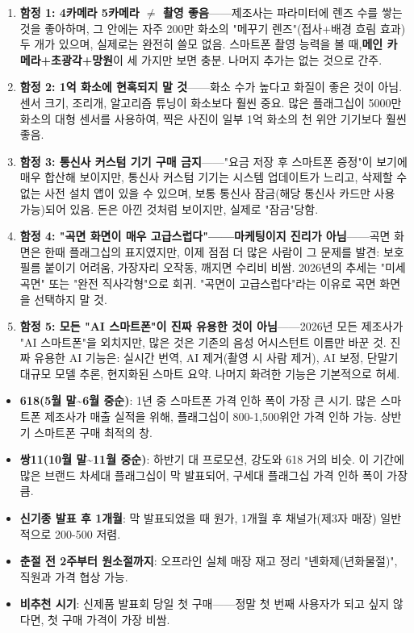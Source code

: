 \begin{enumerate}
  \item \textbf{함정 1: 4카메라 5카메라 $\neq$ 촬영 좋음}——제조사는 파라미터에 렌즈 수를 쌓는 것을 좋아하며, 그 안에는 자주 200만 화소의 "메꾸기 렌즈"(접사+배경 흐림 효과) 두 개가 있으며, 실제로는 완전히 쓸모 없음. 스마트폰 촬영 능력을 볼 때,\textbf{메인 카메라+초광각+망원}이 세 가지만 보면 충분. 나머지 추가는 없는 것으로 간주.
  \item \textbf{함정 2: 1억 화소에 현혹되지 말 것}——화소 수가 높다고 화질이 좋은 것이 아님. 센서 크기, 조리개, 알고리즘 튜닝이 화소보다 훨씬 중요. 많은 플래그십이 5000만 화소의 대형 센서를 사용하여, 찍은 사진이 일부 1억 화소의 천 위안 기기보다 훨씬 좋음.
  \item \textbf{함정 3: 통신사 커스텀 기기 구매 금지}——"요금 저장 후 스마트폰 증정"이 보기에 매우 합산해 보이지만, 통신사 커스텀 기기는 시스템 업데이트가 느리고, 삭제할 수 없는 사전 설치 앱이 있을 수 있으며, 보통 통신사 잠금(해당 통신사 카드만 사용 가능)되어 있음. 돈은 아낀 것처럼 보이지만, 실제로 "잠금"당함.
  \item \textbf{함정 4: "곡면 화면이 매우 고급스럽다"——마케팅이지 진리가 아님}——곡면 화면은 한때 플래그십의 표지였지만, 이제 점점 더 많은 사람이 그 문제를 발견: 보호 필름 붙이기 어려움, 가장자리 오작동, 깨지면 수리비 비쌈. 2026년의 추세는 "미세 곡면" 또는 "완전 직사각형"으로 회귀. "곡면이 고급스럽다"라는 이유로 곡면 화면을 선택하지 말 것.
  \item \textbf{함정 5: 모든 "AI 스마트폰"이 진짜 유용한 것이 아님}——2026년 모든 제조사가 "AI 스마트폰"을 외치지만, 많은 것은 기존의 음성 어시스턴트 이름만 바꾼 것. 진짜 유용한 AI 기능은: 실시간 번역, AI 제거(촬영 시 사람 제거), AI 보정, 단말기 대규모 모델 추론, 현지화된 스마트 요약. 나머지 화려한 기능은 기본적으로 허세.
\end{enumerate}


\begin{itemize}
  \item \textbf{618(5월 말\textasciitilde{}6월 중순)}: 1년 중 스마트폰 가격 인하 폭이 가장 큰 시기. 많은 스마트폰 제조사가 매출 실적을 위해, 플래그십이 800-1,500위안 가격 인하 가능. 상반기 스마트폰 구매 최적의 창.
  \item \textbf{쌍11(10월 말\textasciitilde{}11월 중순)}: 하반기 대 프로모션, 강도와 618 거의 비슷. 이 기간에 많은 브랜드 차세대 플래그십이 막 발표되어, 구세대 플래그십 가격 인하 폭이 가장 큼.
  \item \textbf{신기종 발표 후 1개월}: 막 발표되었을 때 원가, 1개월 후 채널가(제3자 매장) 일반적으로 200-500 저렴.
  \item \textbf{춘절 전 2주부터 원소절까지}: 오프라인 실체 매장 재고 정리 "녠화제(년화물절)", 직원과 가격 협상 가능.
  \item \textbf{비추천 시기}: 신제품 발표회 당일 첫 구매——정말 첫 번째 사용자가 되고 싶지 않다면, 첫 구매 가격이 가장 비쌈.
\end{itemize}

